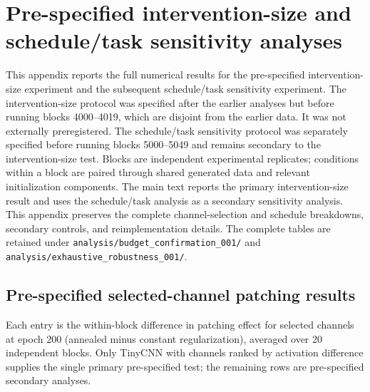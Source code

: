 \section{Pre-specified intervention-size and schedule/task sensitivity analyses}\label{app:confirmation}

This appendix reports the full numerical results for the pre-specified intervention-size experiment and the subsequent schedule/task sensitivity experiment. The intervention-size protocol was specified after the earlier analyses but before running blocks 4000--4019, which are disjoint from the earlier data. It was not externally preregistered. The schedule/task sensitivity protocol was separately specified before running blocks 5000--5049 and remains secondary to the intervention-size test. Blocks are independent experimental replicates; conditions within a block are paired through shared generated data and relevant initialization components. The main text reports the primary intervention-size result and uses the schedule/task analysis as a secondary sensitivity analysis. This appendix preserves the complete channel-selection and schedule breakdowns, secondary controls, and reimplementation details. The complete tables are retained under \texttt{analysis/budget\_confirmation\_001/} and \texttt{analysis/exhaustive\_robustness\_001/}.

\subsection{Pre-specified selected-channel patching results}\label{app:prospective-full}

Each entry is the within-block difference in patching effect for selected channels at epoch 200 (annealed minus constant regularization), averaged over 20 independent blocks. Only TinyCNN with channels ranked by activation difference supplies the single primary pre-specified test; the remaining rows are pre-specified secondary analyses.

